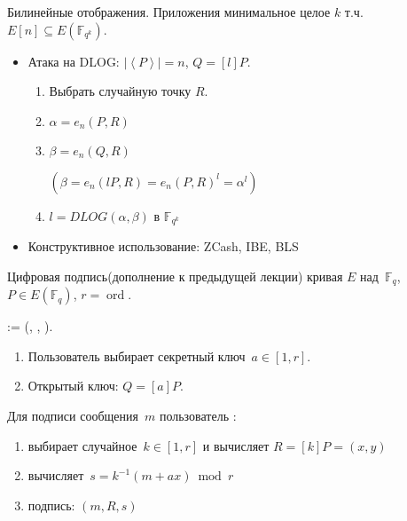 \documentclass{beamer}
\begin{document}
\begin{frame}{Билинейные отображения. Приложения}
 минимальное целое $k$ т.ч. $E[n] \subseteq E(\mathbb{F}_{q^k})$.

\begin{itemize}
    \item Атака на DLOG: $|\left<P\right>| = n$, $Q = [l] P$.
    \begin{enumerate}
        \item Выбрать случайную точку $R$.
        \item $\alpha = e_n(P, R)$
        \item $\beta  = e_n(Q, R)$ \hfill 
        \begin{scriptsize}
        $(\beta = e_n(l P, R) = e_n(P, R)^l = \alpha^l)$
        \end{scriptsize}
        \item $l = DLOG(\alpha, \beta)$ в $\mathbb{F}_{q^k}$
    \end{enumerate}    
    \item Конструктивное использование: ZCash, IBE, BLS
\end{itemize}
\end{frame}

\begin{frame}{Цифровая подпись}{(дополнение к предыдущей лекции)}
	 кривая $E$ над~$\mathbb{F}_q$, $P \in E(\mathbb{F}_q)$, $r = \operatorname{ord}$.
	
	\vspace{1em}
	 := (, , ).
	
	\vspace{1em}
	
	\begin{enumerate}
		\item Пользователь \structure{\faUserSecret} выбирает секретный ключ~$a \in [1, r]$.
		\item Открытый ключ: $Q = [a] P$.
	\end{enumerate}

	\vspace{1em}
	
	Для подписи сообщения~$m$ пользователь \structure{\faUserSecret}:
	\begin{enumerate}
		\item выбирает случайное~$k \in [1, r]$ и вычисляет $R = [k] P  = (x, y)$
		\item вычисляет~$s = k^{-1} (m + a x) \bmod{r}$
		\item подпись: $(m, R, s)$
	\end{enumerate}
\end{frame}
\end{document}
